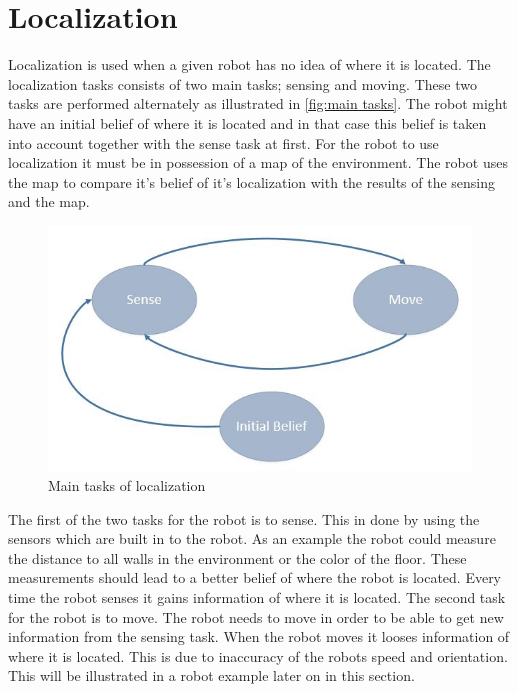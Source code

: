 
\section{Localization} %
\label{sec:localization}

Localization is used when a given robot has no idea of where it is located. The localization tasks consists of two main tasks; sensing and moving. These two tasks are performed alternately as illustrated in \autoref{fig:main tasks}. The robot might have an initial belief of where it is located and in that case this belief is taken into account together with the sense task at first. For the robot to use localization it must be in possession of a map of the environment. The robot uses the map to compare it's belief of it's localization with the results of the sensing and the map.\\

\begin{figure}[H]
\centering
\includegraphics[scale=0.45]{images/SenseMoveInitialBelief}
\caption{Main tasks of localization}
\label{fig:main tasks}
\end{figure}

The first of the two tasks for the robot is to sense. This in done by using the sensors which are built in to the robot. As an example the robot could measure the distance to all walls in the environment or the color of the floor. These measurements should lead to a better belief of where the robot is located. Every time the robot senses it gains information of where it is located. The second task for the robot is to move. The robot needs to move in order to be able to get new information from the sensing task. When the robot moves it looses information of where it is located. This is due to inaccuracy of the robots speed and orientation. This will be illustrated in a robot example later on in this section.\\

